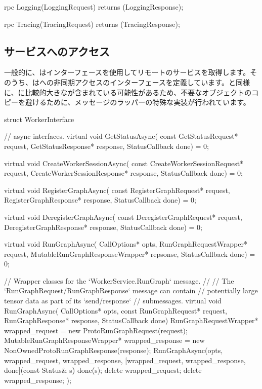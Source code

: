 \begin{content}
\begin{leftbar}
\begin{c++}
{  rpc Logging(LoggingRequest) 
      returns (LoggingResponse);

  rpc Tracing(TracingRequest) 
      returns (TracingResponse);
}
\end{c++}
\end{leftbar}

\subsection{サービスへのアクセス}

一般的に、はインターフェースを使用してリモートのサービスを取得します。そのうち、はへの非同期アクセスのインターフェースを定義しています。と同様に、に比較的大きなが含まれている可能性があるため、不要なオブジェクトのコピーを避けるために、メッセージのラッパーの特殊な実装が行われています。

\begin{leftbar}
\begin{c++}
struct WorkerInterface {
  // async interfaces.
  virtual void GetStatusAsync(
      const GetStatusRequest* request,
      GetStatusResponse* response,
      StatusCallback done) = 0;

  virtual void CreateWorkerSessionAsync(
      const CreateWorkerSessionRequest* request,
      CreateWorkerSessionResponse* response, 
      StatusCallback done) = 0;

  virtual void RegisterGraphAsync(
      const RegisterGraphRequest* request,
      RegisterGraphResponse* response,
      StatusCallback done) = 0;

  virtual void DeregisterGraphAsync(
      const DeregisterGraphRequest* request,
      DeregisterGraphResponse* response,
      StatusCallback done) = 0;

  virtual void RunGraphAsync(
      CallOptions* opts, 
      RunGraphRequestWrapper* request,
      MutableRunGraphResponseWrapper* repsonse,
      StatusCallback done) = 0;

  // Wrapper classes for the `WorkerService.RunGraph` message.
  //
  // The `RunGraphRequest/RunGraphResponse` message can contain 
  // potentially large tensor data as part of its `send/response`
  // submessages.
  virtual void RunGraphAsync(
      CallOptions* opts, 
      const RunGraphRequest* request,
      RunGraphResponse* response, 
      StatusCallback done) {
    RunGraphRequestWrapper* wrapped_request = 
        new ProtoRunGraphRequest(request);
    MutableRunGraphResponseWrapper* wrapped_response =
        new NonOwnedProtoRunGraphResponse(response);
    RunGraphAsync(opts, wrapped_request, wrapped_response,
        [wrapped_request, wrapped_response, done](const Status& s) {
            done(s);
            delete wrapped_request;
            delete wrapped_response;
        });
  }

}
\end{c++}
\end{leftbar}
\end{content}
